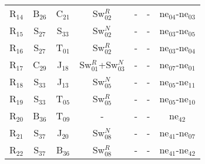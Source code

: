 \begin{table}[!h]
{{\begin{tabular}{ c c c c c c c }
                    R$_{14}$  & B$_{26}$ & C$_{21}$ & Sw$_{02}^{R}$ & - & - & ne$_{04}$-ne$_{03}$\\
                    R$_{15}$  & S$_{27}$ & S$_{33}$ & Sw$_{02}^{N}$ & - & - & ne$_{03}$-ne$_{05}$\\
                    R$_{16}$  & S$_{27}$ & T$_{01}$ & Sw$_{02}^{R}$ & - & - & ne$_{03}$-ne$_{04}$\\
                    R$_{17}$  & C$_{29}$ & J$_{18}$ & Sw$_{01}^{R}$+Sw$_{03}^{N}$ & - & - & ne$_{07}$-ne$_{01}$\\
                    R$_{18}$  & S$_{33}$ & J$_{13}$ & Sw$_{05}^{N}$ & - & - & ne$_{05}$-ne$_{11}$\\
                    R$_{19}$  & S$_{33}$ & T$_{05}$ & Sw$_{05}^{R}$ & - & - & ne$_{05}$-ne$_{10}$\\
                    R$_{20}$  & B$_{36}$ & T$_{09}$ & - & - & - & ne$_{42}$\\
                    R$_{21}$  & S$_{37}$ & J$_{20}$ & Sw$_{08}^{N}$ & - & - & ne$_{41}$-ne$_{07}$\\
                    R$_{22}$  & S$_{37}$ & B$_{36}$ & Sw$_{08}^{R}$ & - & - & ne$_{41}$-ne$_{42}$\\
                \hline
            \end{tabular}
        }
     }
    \end{table}